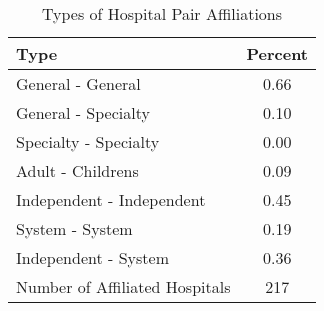 \begin{table}[ht!]
\centering
\caption{Types of Hospital Pair Affiliations\label{tab:hospital_pair_types}}
\centering
\begin{tabular}[t]{lc}
\toprule
Type  & Percent\\
\midrule
General - General & 0.66\\
General - Specialty & 0.10\\
Specialty - Specialty & 0.00\\
\addlinespace[0.5em]
Adult - Childrens & 0.09\\
\addlinespace[0.5em]
Independent - Independent & 0.45\\
System - System & 0.19\\
Independent - System & 0.36\\
\addlinespace[0.5em]
Number of Affiliated Hospitals & 217\\
\bottomrule
\end{tabular}
\end{table}
